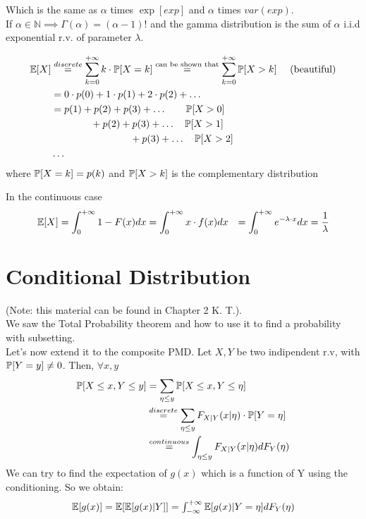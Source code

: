 Which is the same as $\alpha$ times $\exp[exp]$ and $\alpha$ times $var(exp)$.
\\ If $\alpha \in \mathbb{N} \implies \Gamma(\alpha) = (\alpha-1)!$ and the gamma
distribution is the sum of $\alpha$ i.i.d exponential r.v. of parameter $\lambda$.

\begin{equation} $$
  \begin{split}
  \exp[X]&\stackrel{discrete}{=} \sum\limits_{k=0}^{+\infty} k \cdot \prob[X=k]
  \stackrel{\text{can be shown  that}}{=} \sum\limits_{k=0}^{+\infty} \prob[X>k] \quad\mbox{  (beautiful)}\\
  &=0 \cdot p(0) + 1 \cdot p(1) + 2 \cdot p(2) + \dots \\
  &= p(1) + p(2) + p(3)+ \dots \qquad \prob[X>0]\\
  & \qquad \qquad + p(2) + p(3) +\dots \quad \prob[X>1]\\
  & \qquad \qquad \qquad \qquad + p(3)+ \dots \quad \prob[X>2] \\
  & \dots
  \end{split}$$
\end{equation}
where $\mathbb{P}[X=k]=p(k)$ and $\mathbb{P}[X>k]$ is the complementary distribution

In the continuous case
\begin{equation}$$
  \begin{split}
    \exp[X] &= \int_{0}^{+\infty} 1-F(x) dx = \int_{0}^{+\infty} x \cdot f(x) dx
    &=\int_{0}^{+\infty} e^{-\lambda \cdot x} dx = \frac{1}{\lambda}
  \end{split}$$
\end{equation}

\section{Conditional Distribution}
(Note: this material can be found in Chapter 2 K. T.).\\
We saw the Total Probability theorem and how to use it to find a probability with subsetting.\\
Let's now extend it to the composite PMD. Let $X,Y$ be two indipendent r.v, with $\mathbb{P}[Y=y]\neq 0$.
Then, $\forall x,y$
\begin{equation}$$
  \begin{split}
    \prob[X\le x, Y \le y] &= \sum \limits_{\eta \le y} \prob[X \le x , Y \le \eta] \\
    &\stackrel{discrete}{=} \sum \limits_{\eta \le y} F_{X|Y}(x | \eta) \cdot \prob[Y=\eta]\\
    &\stackrel{continuous}{=} \int_{\eta \le y} F_{X|Y}(x|\eta) dF_Y(\eta)
  \end{split}$$
\end{equation}
We can try to find the expectation of $g(x)$ which is a function of Y using the conditioning. So we obtain:
\begin{equation}
  $$\exp[g(x)]=\exp[\exp[g(x)|Y]] = \int_{-\infty}^{+\infty}\exp[g(x)|Y=\eta] dF_Y(\eta)$$
\end{equation}

